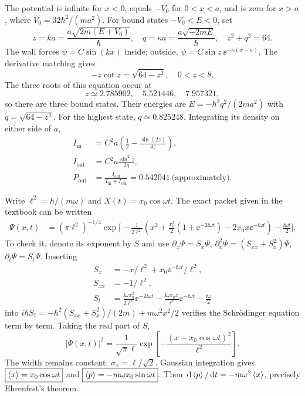 The potential is infinite for $x<0$, equals
$-V_0$ for $0<x<a$, and is zero for $x>a$,
where $V_0=32\hbar^2/(ma^2)$. For bound
states $-V_0<E<0$, set
\begin{equation}
z=ka=\frac{a\sqrt{2m(E+V_0)}}{\hbar},
\quad q=\kappa a=\frac{a\sqrt{-2mE}}{\hbar},
\quad z^2+q^2=64.
\end{equation}
The wall forces $\psi=C\sin(kx)$ inside;
outside, $\psi=C\sin z\,\ee^{-\kappa(x-a)}$.
The derivative matching gives
\begin{equation}
\boxed{-z\cot z=\sqrt{64-z^2}},\quad0<z<8.
\end{equation}
The three roots of this equation occur at
\begin{equation}
z\simeq2.785902,\quad5.521446,\quad7.957321,
\end{equation}
so there are three bound states. Their energies are
$E=-\hbar^2q^2/(2ma^2)$ with
$q=\sqrt{64-z^2}$.
For the highest state, $q\simeq0.825248$.
Integrating its density on either side of $a$,
\begin{align}
I_{\mathrm{in}}&=C^2a\left(
\frac12-\frac{\sin(2z)}{4z}\right),\\
I_{\mathrm{out}}&=C^2a\frac{\sin^2z}{2q},\\
P_{\mathrm{out}}&=\frac{I_{\mathrm{out}}}{I_{\mathrm{in}}+
I_{\mathrm{out}}}
=\boxed{0.542041\ \text{(approximately)}}.
\end{align}

Write $\ell^2=\hbar/(m\omega)$ and
$X(t)=x_0\cos\omega t$. The exact packet
given in the textbook can be written
\begin{align}
\Psi(x,t)&=(\pi\ell^2)^{-1/4}
\exp\Bigg[-\frac1{2\ell^2}
\left(x^2+\frac{x_0^2}2
(1+\ee^{-2\ii\omega t})
-2x_0x\ee^{-\ii\omega t}\right)
-\frac{\ii\omega t}{2}\Bigg].
\end{align}
To check it, denote its exponent by $S$ and use
$\partial_x\Psi=S_x\Psi$,
$\partial_x^2\Psi=(S_{xx}+S_x^2)\Psi$,
$\partial_t\Psi=S_t\Psi$. Inserting
\begin{align}
S_x&=-x/\ell^2+x_0\ee^{-\ii\omega t}/\ell^2,\\
S_{xx}&=-1/\ell^2,\\
S_t&=\frac{\ii\omega x_0^2}{2\ell^2}\ee^{-2\ii\omega t}
-\frac{\ii\omega x_0 x}{\ell^2}\ee^{-\ii\omega t}
-\frac{\ii\omega}{2}
\end{align}
into $i\hbar S_t=
-\hbar^2(S_{xx}+S_x^2)/(2m)+m\omega^2x^2/2$
verifies the Schrödinger equation term by term.
Taking the real part of $S$,
\begin{equation}
\boxed{|\Psi(x,t)|^2=
\frac1{\sqrt{\pi}\ell}
\exp\left[-\frac{(x-x_0\cos\omega t)^2}{\ell^2}\right]}.
\end{equation}
The width remains constant:
$\sigma_x=\ell/\sqrt2$.
Gaussian integration gives
$\boxed{\left\langle x\right\rangle=x_0\cos\omega t}$ and
$\boxed{\left\langle p\right\rangle=-m\omega x_0\sin\omega t}$.
Then $\,\mathrm d\left\langle p\right\rangle/\,\mathrm d t=-m\omega^2\left\langle x\right\rangle$,
precisely Ehrenfest's theorem.

